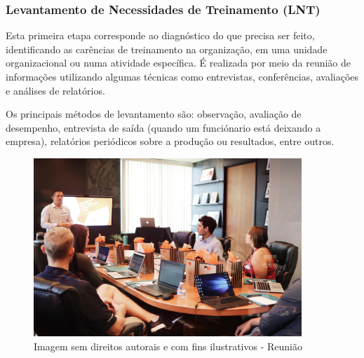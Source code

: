 \documentclass[12pt]{article}
\begin{document}
\subsubsection{Levantamento de Necessidades de Treinamento (LNT)}

Esta primeira etapa corresponde ao diagnóstico do que precisa ser feito, identificando as carências de treinamento na organização, em uma unidade organizacional ou numa atividade específica. É realizada por meio da reunião de informações utilizando algumas técnicas como entrevistas, conferências, avaliações e análises de relatórios.

Os principais métodos de levantamento são: observação, avaliação de desempenho, entrevista de saída (quando um funciónario está deixando a empresa), relatórios periódicos sobre a produção ou resultados, entre outros.

\begin{figure}[h]
	\centering
	\includegraphics[width=0.9\textwidth]{build/images/reuniao}
	\caption{Imagem sem direitos autorais e com fins ilustrativos - Reunião}
	\label{fig:mesh1}
\end{figure}

\newpage
\end{document}
